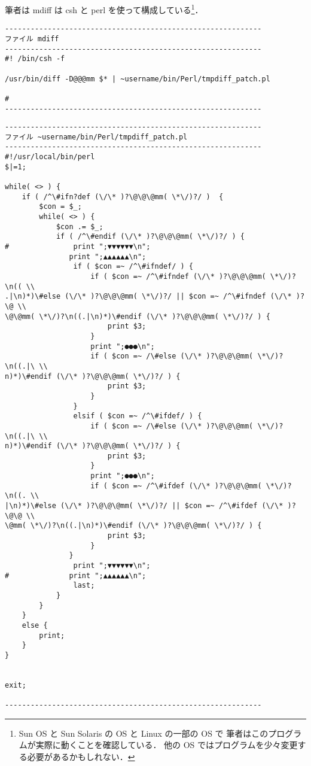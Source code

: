 筆者は mdiff は csh と perl を使って構成している\footnote{Sun OS と
Sun Solaris の OS と Linux の一部の OS で
筆者はこのプログラムが実際に動くことを確認している．
他の OS ではプログラムを少々変更する必要があるかもしれない．}．

\begin{verbatim}
------------------------------------------------------------
ファイル mdiff
------------------------------------------------------------
#! /bin/csh -f

/usr/bin/diff -D@@@mm $* | ~username/bin/Perl/tmpdiff_patch.pl

#
------------------------------------------------------------
\end{verbatim}


\begin{verbatim}
------------------------------------------------------------
ファイル ~username/bin/Perl/tmpdiff_patch.pl
------------------------------------------------------------
#!/usr/local/bin/perl
$|=1;

while( <> ) {
    if ( /^\#ifn?def (\/\* )?\@\@\@mm( \*\/)?/ )  {
        $con = $_;
        while( <> ) {
            $con .= $_;
            if ( /^\#endif (\/\* )?\@\@\@mm( \*\/)?/ ) {
#               print ";▼▼▼▼▼▼\n";
               print ";▲▲▲▲▲▲\n";
                if ( $con =~ /^\#ifndef/ ) {
                    if ( $con =~ /^\#ifndef (\/\* )?\@\@\@mm( \*\/)?\n(( \\
.|\n)*)\#else (\/\* )?\@\@\@mm( \*\/)?/ || $con =~ /^\#ifndef (\/\* )?\@ \\
\@\@mm( \*\/)?\n((.|\n)*)\#endif (\/\* )?\@\@\@mm( \*\/)?/ ) {
                        print $3;
                    }
                    print ";●●●\n";
                    if ( $con =~ /\#else (\/\* )?\@\@\@mm( \*\/)?\n((.|\ \\
n)*)\#endif (\/\* )?\@\@\@mm( \*\/)?/ ) {
                        print $3;
                    }          
                }
                elsif ( $con =~ /^\#ifdef/ ) {
                    if ( $con =~ /\#else (\/\* )?\@\@\@mm( \*\/)?\n((.|\ \\
n)*)\#endif (\/\* )?\@\@\@mm( \*\/)?/ ) {
                        print $3; 
                    }           
                    print ";●●●\n";
                    if ( $con =~ /^\#ifdef (\/\* )?\@\@\@mm( \*\/)?\n((. \\
|\n)*)\#else (\/\* )?\@\@\@mm( \*\/)?/ || $con =~ /^\#ifdef (\/\* )?\@\@ \\
\@mm( \*\/)?\n((.|\n)*)\#endif (\/\* )?\@\@\@mm( \*\/)?/ ) {
                        print $3;
                    }   
               }
                print ";▼▼▼▼▼▼\n";
#              print ";▲▲▲▲▲▲\n";
                last;
            }
        }
    }
    else {
        print;
    }
}


exit;

------------------------------------------------------------
\end{verbatim}

